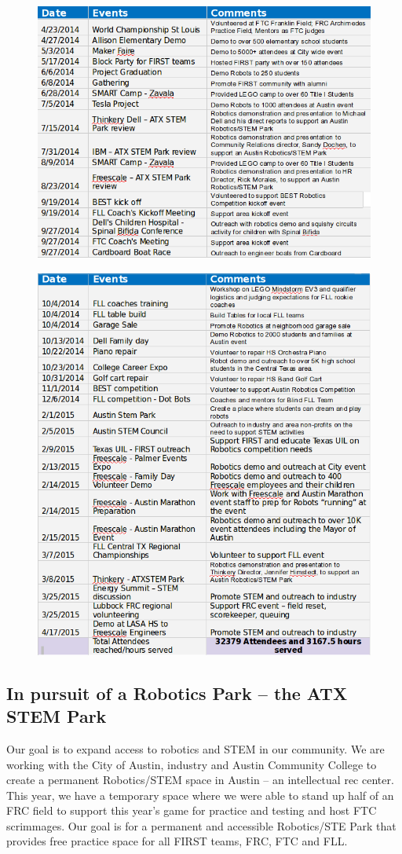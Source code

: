 \begin{figure}[H]
	\centering
	\includegraphics[width=0.9\linewidth]{outreach}
	\label{fig:outreach}
\end{figure}
\begin{figure}[H]
	\centering
	\includegraphics[width=0.9\linewidth]{outreach1}
	\label{fig:outreach1}
\end{figure}

\subsection{In pursuit of a Robotics Park – the ATX STEM Park}
Our goal is to expand access to robotics and STEM in our community. We are working with the City of Austin, industry and Austin Community College to create a permanent Robotics/STEM space in Austin – an intellectual rec center.   This year, we have a temporary space where we were able to stand up half of an FRC field to support this year’s game for practice and testing and host FTC scrimmages.  Our goal is for a permanent and accessible Robotics/STE Park that provides free practice space for all FIRST teams, FRC, FTC and FLL.

